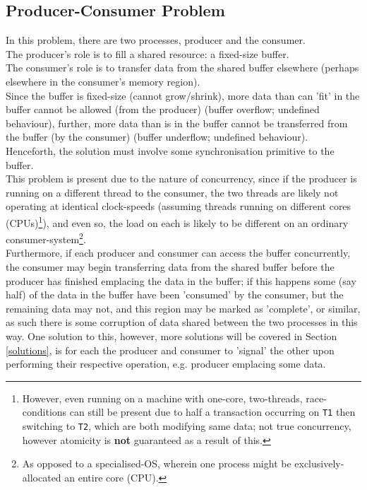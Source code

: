 \subsection{Producer-Consumer Problem}
\label{producer_consumer}
In this problem, there are two processes, producer and the consumer.\\
The producer's role is to fill a shared resource: a fixed-size buffer.\\
The consumer's role is to transfer data from the shared buffer elsewhere (perhaps elsewhere in the consumer's memory region).\\
Since the buffer is fixed-size (cannot grow/shrink), more data than can 'fit' in the buffer cannot be allowed (from the producer) (buffer overflow; undefined behaviour), further, more data than is in the buffer cannot be transferred from the buffer (by the consumer) (buffer underflow; undefined behaviour).\\
Henceforth, the solution must involve some synchronisation primitive to the buffer.\\
This problem is present due to the nature of concurrency, since if the producer is running on a different thread to the consumer, the two threads are likely not operating at identical clock-speeds (assuming threads running on different cores (CPUs)\footnote{However, even running on a machine with one-core, two-threads, race-conditions can still be present due to half a transaction occurring on \texttt{T1} then switching to \texttt{T2}, which are both modifying same data; not true concurrency, however atomicity is \textbf{not} guaranteed as a result of this.}), and even so, the load on each is likely to be different on an ordinary consumer-system\footnote{As opposed to a specialised-OS, wherein one process might be exclusively-allocated an entire core (CPU).}.\\
Furthermore, if each producer and consumer can access the buffer concurrently, the consumer may begin transferring data from the shared buffer before the producer has finished emplacing the data in the buffer; if this happens some (say half) of the data in the buffer have been 'consumed' by the consumer, but the remaining data may not, and this region may be marked as 'complete', or similar, as such there is some corruption of data shared between the two processes in this way. One solution to this, however, more solutions will be covered in Section \ref{solutions}, is for each the producer and consumer to 'signal' the other upon performing their respective operation, e.g. producer emplacing some data.